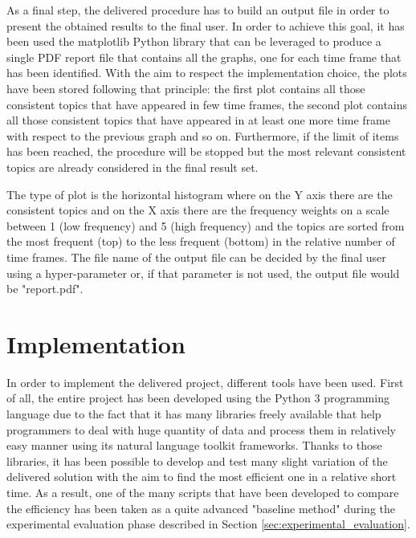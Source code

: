 As a final step, the delivered procedure has to build an output file in order to present the obtained results to the final user. In order to achieve this goal, it has been used the matplotlib Python library \cite{matplotlib-python} that can be leveraged to produce a single PDF report file that contains all the graphs, one for each time frame that has been identified. With the aim to respect the implementation choice, the plots have been stored following that principle: the first plot contains all those consistent topics that have appeared in few time frames, the second plot contains all those consistent topics that have appeared in at least one more time frame with respect to the previous graph and so on. Furthermore, if the limit of items has been reached, the procedure will be stopped but the most relevant consistent topics are already considered in the final result set.

\noindent The type of plot is the horizontal histogram where on the Y axis there are the consistent topics and on the X axis there are the frequency weights on a scale between 1 (low frequency) and 5 (high frequency) and the topics are sorted from the most frequent (top) to the less frequent (bottom) in the relative number of time frames. The file name of the output file can be decided by the final user using a hyper-parameter or, if that parameter is not used, the output file would be "report.pdf".

\section{Implementation}
\label{sec:implementation}
In order to implement the delivered project, different tools have been used. First of all, the entire project has been developed using the Python 3 programming language due to the fact that it has many libraries freely available that help programmers to deal with huge quantity of data and process them in relatively easy manner using its natural language toolkit frameworks. Thanks to those libraries, it has been possible to develop and test many slight variation of the delivered solution with the aim to find the most efficient one in a relative short time. As a result, one of the many scripts that have been developed to compare the efficiency has been taken as a quite advanced "baseline method" during the experimental evaluation phase described in Section \ref{sec:experimental_evaluation}. 

